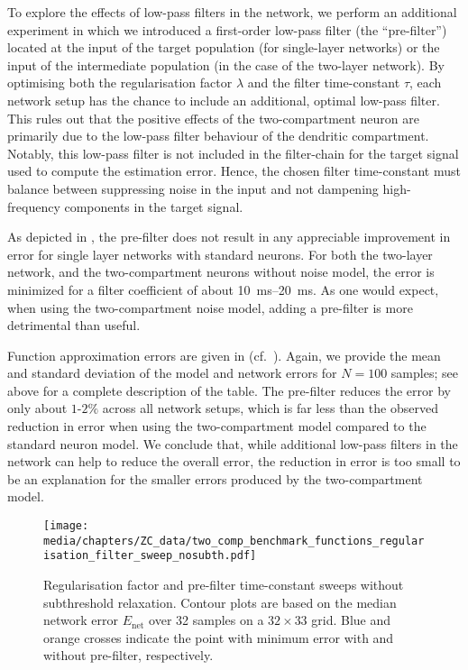 To explore the effects of low-pass filters in the network, we perform an additional experiment in which we introduced a first-order low-pass filter (the \enquote{pre-filter}) located at the input of the target population (for single-layer networks) or the input of the intermediate population (in the case of the two-layer network).
By optimising both the regularisation factor $\lambda$ and the filter time-constant $\tau$, each network setup has the chance to include an additional, optimal low-pass filter.
This rules out that the positive effects of the two-compartment neuron are primarily due to the low-pass filter behaviour of the dendritic compartment.
Notably, this low-pass filter is not included in the filter-chain for the target signal used to compute the estimation error.
Hence, the chosen filter time-constant must balance between suppressing noise in the input and not dampening high-frequency components in the target signal.

As depicted in , the pre-filter does not result in any appreciable improvement in error for single layer networks with standard \LIF neurons.
For both the two-layer \LIF network, and the two-compartment \LIF neurons without noise model, the error is minimized for a filter coefficient of about \SIrange{10}{20}{\milli\second}.
As one would expect, when using the two-compartment \LIF noise model, adding a pre-filter is more detrimental than useful.

Function approximation errors are given in (cf.~).
Again, we provide the mean and standard deviation of the model and network errors for $N = 100$ samples; see above for a complete description of the table.
The pre-filter reduces the error by only about $1$-$2\%$ across all network setups, which is far less than the observed reduction in error when using the two-compartment model compared to the standard \LIF neuron model.
We conclude that, while additional low-pass filters in the network can help to reduce the overall error, the reduction in error is too small to be an explanation for the smaller errors produced by the two-compartment model.

\begin{figure}[p]
	\texttt{[image: media/chapters/ZC\_data/two\_comp\_benchmark\_functions\_regularisation\_filter\_sweep\_nosubth.pdf]}
	\caption[Regularisation factor and pre-filter time-constant sweeps without subthreshold relaxation]{Regularisation factor and pre-filter time-constant sweeps without subthreshold relaxation. Contour plots are based on the median network error $E_\mathrm{net}$ over 32 samples on a $32 \times 33$ grid. Blue and orange crosses indicate the point with minimum error with and without pre-filter, respectively.}
	\label{fig:regularization_parameter_sweep_nosubth}
\end{figure}

